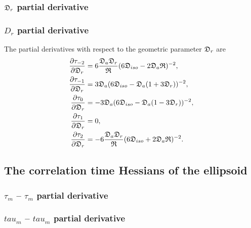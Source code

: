 \begin{latexonly}
    \subsubsection{$\mathfrak{D}_r$ partial derivative}
\end{latexonly}
\begin{htmlonly}
    \subsubsection{$D_r$ partial derivative}
\end{htmlonly}

The partial derivatives with respect to the geometric parameter $\mathfrak{D}_r$ are
\begin{subequations}
\begin{align}
    \frac{\partial \tau_{-2}}{\partial \mathfrak{D}_r} &= 6\frac{\mathfrak{D}_a \mathfrak{D}_r}{\mathfrak{R}} (6\mathfrak{D}_{iso} - 2\mathfrak{D}_a\mathfrak{R})^{-2}, \\
    \frac{\partial \tau_{-1}}{\partial \mathfrak{D}_r} &= 3\mathfrak{D}_a (6\mathfrak{D}_{iso} - \mathfrak{D}_a (1 + 3\mathfrak{D}_r))^{-2}, \\
    \frac{\partial \tau_{0}}{\partial \mathfrak{D}_r}  &= -3\mathfrak{D}_a (6\mathfrak{D}_{iso} - \mathfrak{D}_a (1 - 3\mathfrak{D}_r))^{-2}, \\
    \frac{\partial \tau_{1}}{\partial \mathfrak{D}_r}  &= 0, \\
    \frac{\partial \tau_{2}}{\partial \mathfrak{D}_r}  &= -6\frac{\mathfrak{D}_a \mathfrak{D}_r}{\mathfrak{R}} (6\mathfrak{D}_{iso} + 2\mathfrak{D}_a\mathfrak{R})^{-2}.
\end{align}
\end{subequations}




\newpage
\subsection{The correlation time Hessians of the ellipsoid}


\begin{latexonly}
    \subsubsection{$\tau_m$ -- $\tau_m$ partial derivative}
\end{latexonly}
\begin{htmlonly}
    \subsubsection{$tau_m$ -- $tau_m$ partial derivative}
\end{htmlonly}

